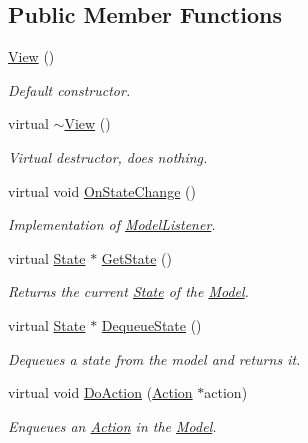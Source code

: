 \subsection*{Public Member Functions}
\begin{CompactItemize}
\item 
\hyperlink{classView_44ad60a768422d3fa8fbd7576950080a}{View} ()
\begin{CompactList}\small\item\em Default constructor. \item\end{CompactList}\item 
virtual \hyperlink{classView_a02a820358e1a7bf7e34d205212ae8f3}{$\sim$View} ()
\begin{CompactList}\small\item\em Virtual destructor, does nothing. \item\end{CompactList}\item 
virtual void \hyperlink{classView_92a0d9fd64b52e7f85d45c46c28a6546}{OnStateChange} ()
\begin{CompactList}\small\item\em Implementation of \hyperlink{classModelListener}{ModelListener}. \item\end{CompactList}\item 
virtual \hyperlink{classState}{State} $\ast$ \hyperlink{classView_b766758f8cf0667f20305f5b52cbe64e}{GetState} ()
\begin{CompactList}\small\item\em Returns the current \hyperlink{classState}{State} of the \hyperlink{classModel}{Model}. \item\end{CompactList}\item 
virtual \hyperlink{classState}{State} $\ast$ \hyperlink{classView_8d0521fb0bd96564906deab7fb58d411}{DequeueState} ()
\begin{CompactList}\small\item\em Dequeues a state from the model and returns it. \item\end{CompactList}\item 
virtual void \hyperlink{classView_cb2535000de204a5e4202c6ecce64666}{DoAction} (\hyperlink{classAction}{Action} $\ast$action)
\begin{CompactList}\small\item\em Enqueues an \hyperlink{classAction}{Action} in the \hyperlink{classModel}{Model}. \item\end{CompactList}\end{CompactItemize}
